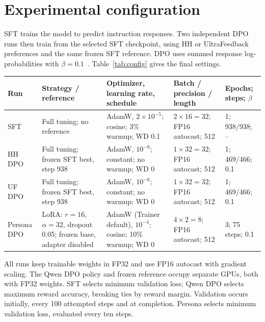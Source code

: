 \documentclass[10pt,a4paper]{article}
\begin{document}
\newpage
\section{Experimental configuration}
SFT trains the model to predict instruction responses. Two independent DPO runs then train from the selected SFT checkpoint, using HH or UltraFeedback preferences and the same frozen SFT reference. DPO uses summed response log-probabilities with $\beta=0.1$~\cite{dpo}. Table~\ref{tab:config} gives the final settings.

\begin{center}\small
\begin{tabularx}{\linewidth}{@{}lYYYY@{}}\toprule
Run & Strategy / reference & Optimizer, learning rate, schedule & Batch / precision / length & Epochs; steps; $\beta$\\\midrule
SFT & Full tuning; no reference & AdamW, $2\!\times\!10^{-5}$; cosine; 3\% warmup; WD 0.1 & $2\times16=32$; FP16 autocast; 512 & 1; 938/938; --\\
HH DPO & Full tuning; frozen SFT best, step 938 & AdamW, $10^{-6}$; constant; no warmup; WD 0 & $1\times32=32$; FP16 autocast; 512 & 1; 469/466; 0.1\\
UF DPO & Full tuning; frozen SFT best, step 938 & AdamW, $10^{-6}$; constant; no warmup; WD 0 & $1\times32=32$; FP16 autocast; 512 & 1; 469/466; 0.1\\
Persona DPO & LoRA: $r=16$, $\alpha=32$, dropout 0.05; frozen base, adapter disabled & AdamW (Trainer default), $10^{-4}$; cosine; 10\% warmup; WD 0 & $4\times2=8$; FP16 autocast; 512 & 3; 75 steps; 0.1\\\bottomrule
\end{tabularx}
\label{tab:config}
\end{center}

All runs keep trainable weights in FP32 and use FP16 autocast with gradient scaling. The Qwen DPO policy and frozen reference occupy separate GPUs, both with FP32 weights. SFT selects minimum validation loss; Qwen DPO selects maximum reward accuracy, breaking ties by reward margin. Validation occurs initially, every 100 attempted steps and at completion. Persona selects minimum validation loss, evaluated every ten steps.
\end{document}
